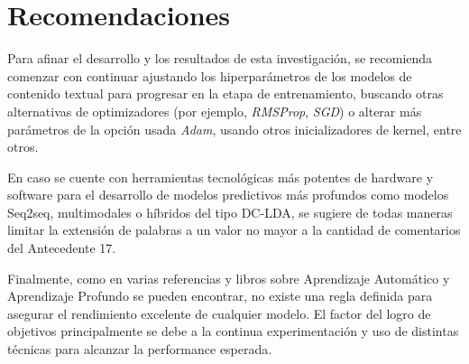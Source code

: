 \section{Recomendaciones}
Para afinar el desarrollo y los resultados de esta investigación, se recomienda comenzar con continuar ajustando los hiperparámetros de los modelos de contenido textual para progresar en la etapa de entrenamiento, buscando otras alternativas de optimizadores (por ejemplo, \textit{RMSProp}, \textit{SGD}) o alterar más parámetros de la opción usada \textit{Adam}, usando otros inicializadores de kernel, entre otros.

En caso se cuente con herramientas tecnológicas más potentes de hardware y software para el desarrollo de modelos predictivos más profundos como modelos Seq2seq, multimodales o híbridos del tipo DC-LDA, se sugiere de todas maneras limitar la extensión de palabras a un valor no mayor a la cantidad de comentarios del Antecedente 17.

Finalmente, como en varias referencias y libros sobre Aprendizaje Automático y Aprendizaje Profundo se pueden encontrar, no existe una regla definida para asegurar el rendimiento excelente de cualquier modelo. El factor del logro de objetivos principalmente se debe a la continua experimentación y uso de distintas técnicas para alcanzar la performance esperada.